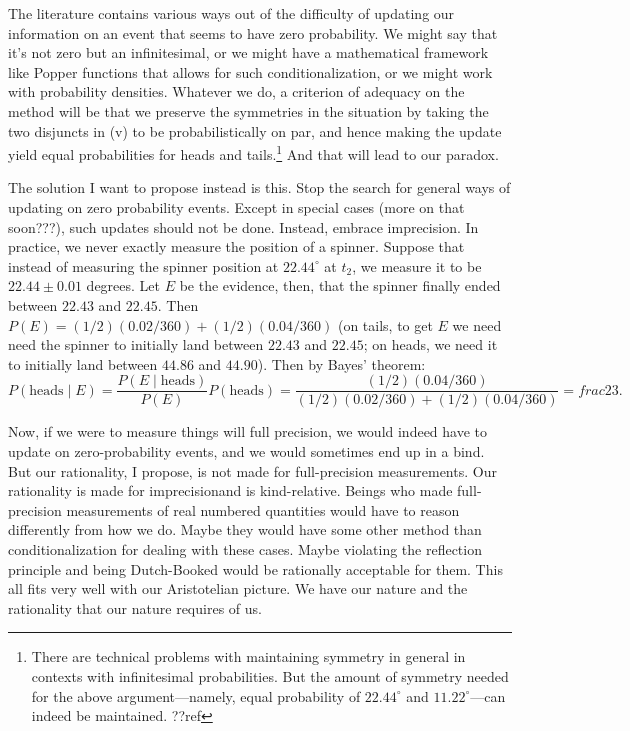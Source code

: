 The literature contains various ways out of the difficulty of updating our information on an event that seems to have zero probability.
We might say that it's not zero but an infinitesimal, or we might have a mathematical framework like Popper functions that allows
for such conditionalization, or we might work with probability densities. Whatever we do, a criterion of adequacy on the method will be that we 
preserve the symmetries in the situation by taking the two disjuncts in (v) to be probabilistically on par, and hence making the 
update yield equal probabilities for heads and tails.\footnote{There are technical problems with maintaining symmetry in general in contexts with
infinitesimal probabilities. But the amount of symmetry needed for the above argument---namely, equal probability of $22.44^\circ$ and
$11.22^\circ$---can indeed be maintained. ??ref} And that will lead to our paradox.

The solution I want to propose instead is this. Stop the search for general ways of updating on zero probability events. Except in special
cases (more on that soon???), such updates should not be done.  Instead, embrace imprecision. In practice, we never exactly measure the
position of a spinner. Suppose that instead of measuring the spinner position at $22.44^\circ$ at $t_2$, we measure it to be $22.44\pm 0.01$
degrees. Let $E$ be the evidence, then, that the spinner finally ended between $22.43$ and $22.45$. Then $P(E)=(1/2)(0.02/360)+(1/2)(0.04/360)$
(on tails, to get $E$ we need need the spinner to initially land between $22.43$ and $22.45$; on heads, we need it to 
initially land between $44.86$ and $44.90$). Then by Bayes' theorem:
$$
    P(\text{heads} \mid E) = \frac{P(E \mid \text{heads})}{P(E)} P(\text{heads}) = \frac{ (1/2)(0.04/360) }{ (1/2)(0.02/360)+(1/2)(0.04/360) } = 
	frac23.
$$    

Now, if we were to measure things will full precision, we would indeed have to update on zero-probability events, and we would sometimes
end up in a bind. But our rationality, I propose, is not made for full-precision measurements. Our rationality is made for imprecisionand is 
kind-relative. Beings who made full-precision measurements of real numbered quantities would 
have to reason differently from how we do. Maybe they would have some other method than conditionalization for dealing with these cases.
Maybe violating the reflection principle and being Dutch-Booked would be rationally acceptable for them. This all fits very well with 
our Aristotelian picture. We have our nature and the rationality that our nature requires of us.


